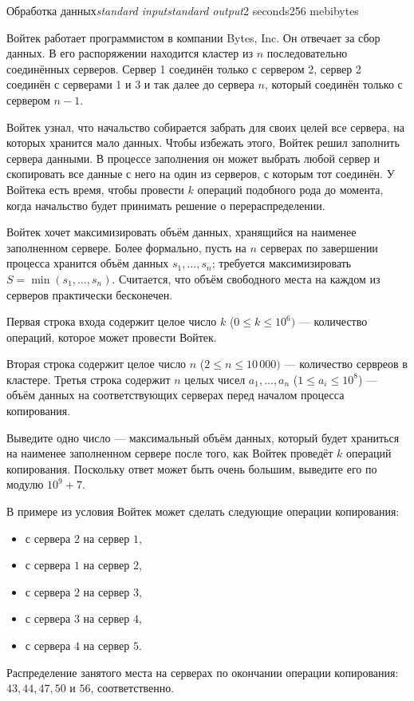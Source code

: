 \begin{problem}{Обработка данных}{\textsl{standard input}}{\textsl{standard output}}{2 seconds}{256 mebibytes}{}

Войтек работает программистом в компании Bytes, Inc. Он отвечает за сбор данных. В его распоряжении находится кластер из $n$
последовательно соединённых серверов. Сервер 1 соединён только с сервером 2, сервер 2 соединён с серверами 1 и 3 и так далее
до сервера $n$, который соединён только с сервером $n-1$.

Войтек узнал, что начальство собирается забрать для своих целей все сервера, на которых хранится мало данных.
Чтобы избежать этого, Войтек решил заполнить сервера данными. В процессе заполнения он может выбрать любой сервер и скопировать все
данные с него на один из серверов, с которым тот соединён. У Войтека есть время, чтобы провести $k$ операций подобного рода
до момента, когда начальство будет принимать решение о перераспределении.

Войтек хочет максимизировать объём данных, хранящийся на наименее заполненном сервере. Более формально,
пусть на $n$ серверах по завершении процесса хранится объём данных $s_1, \ldots, s_n$; требуется максимизировать $S=\min(s_1, \ldots, s_n)$.
Считается, что объём свободного места на каждом из серверов практически бесконечен.


\InputFile

Первая строка входа содержит целое число $k$ ($0 \leq k \leq 10^6)$ --- количество операций, которое может провести Войтек.

Вторая строка содержит целое число $n$ ($2 \leq n \leq 10\,000)$ --- количество сервреов в кластере.
Третья строка содержит $n$ целых чисел $a_1, \ldots, a_n$ ($1 \leq a_i \leq 10^8$) --- объём данных на соответствующих серверах перед
началом процесса копирования.

\OutputFile

Выведите одно число ---  максимальный объём данных, который будет храниться на наименее заполненном сервере после того, как Войтек проведёт
$k$ операций копирования. Поскольку ответ может быть очень большим, выведите его по модулю $10^9 + 7$.

\Examples
\begin{example}
%
\end{example}

\Note

    В примере из условия Войтек может сделать следующие операции копирования:
    \begin{itemize}
        \item с сервера $2$ на сервер $1$,
        \item с сервера $1$ на сервер $2$,
        \item с сервера $2$ на сервер $3$,
        \item с сервера $3$ на сервер $4$,
        \item с сервера $4$ на сервер $5$.
    \end{itemize}
    Распределение занятого места на серверах по окончании операции копирования: $43, 44, 47, 50$ и $56$, соответственно.


\end{problem}
